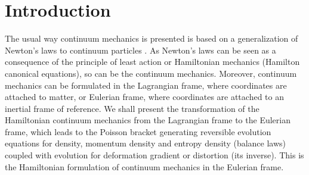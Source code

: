 \documentclass[
10pt, %
a4paper, %
oneside, %
headinclude,footinclude, %
BCOR5mm, %
]{scrartcl}
\begin{document}

\let\thefootnote\relax{}

\let\thefootnote\relax{}
\let\thefootnote\relax{}


\newpage %

\setlength\parindent{10pt} %
\setlength{\parskip}{5pt} %


\section{Introduction}
The usual way continuum mechanics is presented is based on a generalization of Newton's laws to continuum particles \cite{Marsden-hughes}. As Newton's laws can be seen as a consequence of the principle of least action or Hamiltonian mechanics (Hamilton canonical equations), so can be the continuum mechanics. Moreover, continuum mechanics can be formulated in the Lagrangian frame, where coordinates are attached to matter, or Eulerian frame, where coordinates are attached to an inertial frame of reference. We shall present the transformation of the Hamiltonian continuum mechanics from the Lagrangian frame to the Eulerian frame, which leads to the Poisson bracket generating reversible evolution equations for density, momentum density and entropy density (balance laws) coupled with evolution for deformation gradient or distortion (its inverse). This is the Hamiltonian formulation of continuum mechanics in the Eulerian frame.
\end{document}

